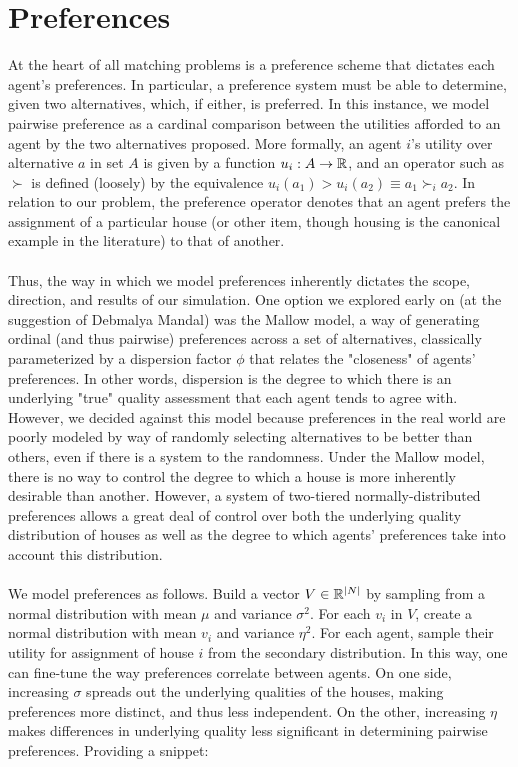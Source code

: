 \documentclass[12pt]{article}
\begin{document}
\section*{Preferences}
At the heart of all matching problems is a preference scheme that dictates each agent's preferences. In particular, a preference system must be able to determine, given two alternatives, which, if either, is preferred. In this instance, we model pairwise preference as a cardinal comparison between the utilities afforded to an agent by the two alternatives proposed. More formally, an agent $i$'s utility over alternative $a$ in set $A$ is given by a function $u_i: A \rightarrow {\Bbb R}$, and an operator such as $\succ$ is defined (loosely) by the equivalence $u_i(a_1) > u_i(a_2) \equiv a_1 \succ_i a_2$. In relation to our problem, the preference operator denotes that an agent prefers the assignment of a particular house (or other item, though housing is the canonical example in the literature) to that of another.\\\\
Thus, the way in which we model preferences inherently dictates the scope, direction, and results of our simulation. One option we explored early on (at the suggestion of Debmalya Mandal) was the Mallow model, a way of generating ordinal (and thus pairwise) preferences across a set of alternatives, classically parameterized by a dispersion factor $\phi$ that relates the "closeness" of agents' preferences. In other words, dispersion is the degree to which there is an underlying "true" quality assessment that each agent tends to agree with. However, we decided against this model because preferences in the real world are poorly modeled by way of randomly selecting alternatives to be better than others, even if there is a system to the randomness. Under the Mallow model, there is no way to control the degree to which a house is more inherently desirable than another. However, a system of two-tiered normally-distributed preferences allows a great deal of control over both the underlying quality distribution of houses as well as the degree to which agents' preferences take into account this distribution.\\\\We model preferences as follows. Build a vector $V \in {\Bbb R^{|N|}}$ by sampling from a normal distribution with mean $\mu$ and variance $\sigma^2$. For each $v_i$ in $V$, create a normal distribution with mean $v_i$ and variance $\eta^2$. For each agent, sample their utility for assignment of house $i$ from the secondary distribution. In this way, one can fine-tune the way preferences correlate between agents. On one side, increasing $\sigma$ spreads out the underlying qualities of the houses, making preferences more distinct, and thus less independent. On the other, increasing $\eta$ makes differences in underlying quality less significant in determining pairwise preferences. Providing a snippet:
\end{document}
